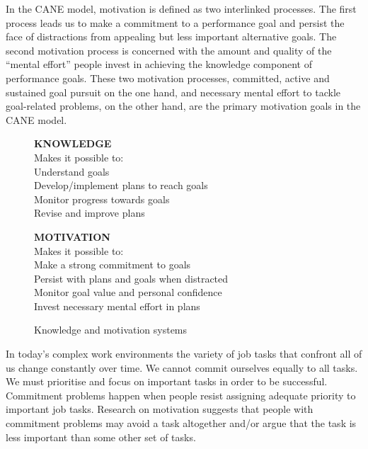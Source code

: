 In the CANE model, motivation is defined as two interlinked processes. The first process leads us to make a commitment to a performance goal and persist the face of distractions from appealing but less important alternative goals. The second motivation process is concerned with the amount and quality of the “mental effort” people invest in achieving the knowledge component of performance goals. These two motivation processes, committed, active and sustained goal pursuit on the one hand, and necessary mental effort to tackle goal-related problems, on the other hand, are the primary motivation goals in the CANE model.


\begin{figure}[ht]

    \begin{minipage}[t]{0.5\linewidth}
    {\bf KNOWLEDGE}\\
    Makes it possible to:\\
    
    {\small
    Understand goals\\
    Develop/implement plans to reach goals\\
    Monitor progress towards goals\\
    Revise and improve plans
    }
    \end{minipage}
    \begin{minipage}[t]{0.5\linewidth}
    {\bf MOTIVATION}\\
    Makes it possible to:\\
    
    {\small
    Make a strong commitment to goals\\
    Persist with plans and goals when distracted\\
    Monitor goal value and personal confidence\\
    Invest necessary mental effort in plans
    }
    \end{minipage}
    
    \caption{Knowledge and motivation systems}

\end{figure}

In today’s complex work environments the variety of job tasks that confront all of us change constantly over time. We cannot commit ourselves equally to all tasks. We must prioritise and focus on important tasks in order to be successful. Commitment problems happen when people resist assigning adequate priority to important job tasks. Research on motivation suggests that people with commitment problems may avoid a task altogether and/or argue that the task is less important than some other set of tasks.

